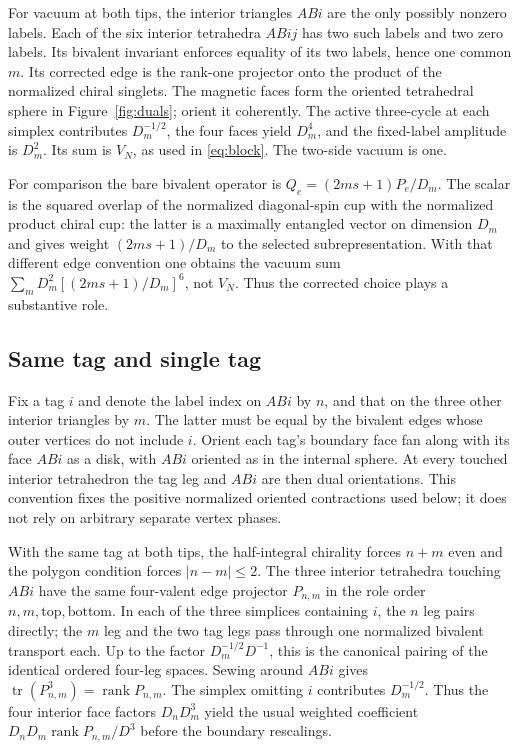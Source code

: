 \documentclass[11pt]{article}
\theoremstyle{remark}
\DeclareMathOperator{\tr}{tr}
\DeclareMathOperator{\rank}{rank}
\begin{document}
For vacuum at both tips, the interior triangles \(ABi\) are the only possibly nonzero labels. Each of the six interior tetrahedra \(ABij\) has two such labels and two zero labels. Its bivalent invariant enforces equality of its two labels, hence one common \(m\). Its corrected edge is the rank-one projector onto the product of the normalized chiral singlets. The magnetic faces form the oriented tetrahedral sphere in Figure~\ref{fig:duals}; orient it coherently. The active three-cycle at each simplex contributes \(D_m^{-1/2}\), the four faces yield \(D_m^4\), and the fixed-label amplitude is \(D_m^2\). Its sum is \(V_N\), as used in \eqref{eq:block}. The two-side vacuum is one.

For comparison the bare bivalent operator is \(Q_e=(2ms+1)P_e/D_m\). The scalar is the squared overlap of the normalized diagonal-spin cup with the normalized product chiral cup: the latter is a maximally entangled vector on dimension \(D_m\) and gives weight \((2ms+1)/D_m\) to the selected subrepresentation. With that different edge convention one obtains the vacuum sum \(\sum_m D_m^2[(2ms+1)/D_m]^6\), not \(V_N\). Thus the corrected choice plays a substantive role.

\subsection{Same tag and single tag}

Fix a tag \(i\) and denote the label index on \(ABi\) by \(n\), and that on the three other interior triangles by \(m\). The latter must be equal by the bivalent edges whose outer vertices do not include \(i\). Orient each tag's boundary face fan along with its face \(ABi\) as a disk, with \(ABi\) oriented as in the internal sphere. At every touched interior tetrahedron the tag leg and \(ABi\) are then dual orientations. This convention fixes the positive normalized oriented contractions used below; it does not rely on arbitrary separate vertex phases.

With the same tag at both tips, the half-integral chirality forces \(n+m\) even and the polygon condition forces \(|n-m|\leq2\). The three interior tetrahedra touching \(ABi\) have the same four-valent edge projector \(P_{n,m}\) in the role order \(n,m,\mathrm{top},\mathrm{bottom}\). In each of the three simplices containing \(i\), the \(n\) leg pairs directly; the \(m\) leg and the two tag legs pass through one normalized bivalent transport each. Up to the factor \(D_m^{-1/2}D^{-1}\), this is the canonical pairing of the identical ordered four-leg spaces. Sewing around \(ABi\) gives \(\tr(P_{n,m}^3)=\rank P_{n,m}\). The simplex omitting \(i\) contributes \(D_m^{-1/2}\). Thus the four interior face factors \(D_nD_m^3\) yield the usual weighted coefficient \(D_nD_m\rank P_{n,m}/D^3\) before the boundary rescalings.
\end{document}
